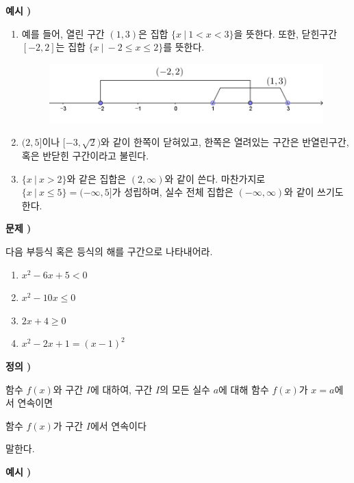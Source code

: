\documentclass{oblivoir}
\newcounter{num}
\newcommand\defi[1]
{\bigskip\par\noindent\stepcounter{num} \textbf{정의 \thenum) #1}\par\noindent}
\newcommand\exam[1]
{\bigskip\par\noindent\stepcounter{num} \textbf{예시 \thenum) #1}\par\noindent}
\newcommand\prob[1]
{\bigskip\par\noindent\stepcounter{num} \textbf{문제 \thenum) #1}\par\noindent}
\newcommand\ba{\ensuremath{\:|\:}}
\let\emph\textsf
\begin{document}
%
\exam{}
\begin{enumerate}[label=(\arabic*)]
\item
예를 들어, 열린 구간 \((1,3)\)은 집합 \(\{x\ba 1<x<3\}\)을 뜻한다.
또한, 닫힌구간 \([-2,2]\)는 집합 \(\{x\ba-2\le x\le 2\}\)를 뜻한다.
\begin{figure}[h!]
\centering
\includegraphics{intervals}
\end{figure}
\item
\((2,5]\)이나 \([-3,\sqrt2)\)와 같이 한쪽이 닫혀있고, 한쪽은 열려있는 구간은 \emph{반열린구간}, 혹은 \emph{반닫힌 구간}이라고 불린다.
\item
\(\{x\ba x>2\}\)와 같은 집합은 \((2,\infty)\)와 같이 쓴다.
마찬가지로 \(\{x\ba x\le 5\}=(-\infty,5]\)가 성립하며, 실수 전체 집합은 \((-\infty,\infty)\)와 같이 쓰기도 한다.
\end{enumerate}

%
\prob{}
다음 부등식 혹은 등식의 해를 구간으로 나타내어라.
\begin{enumerate}[label=(\arabic*)]
\item
\(x^2-6x+5<0\)
\item
\(x^2-10x\le0\)
\item
\(2x+4\ge0\)
\item
\(x^2-2x+1=(x-1)^2\)
\end{enumerate}
\begin{mdframed}

%
\defi{}
함수 \(f(x)\)와 구간 \(I\)에 대하여, 구간 \(I\)의 모든 실수 \(a\)에 대해 함수 \(f(x)\)가 \(x=a\)에서 연속이면
\begin{center}
함수 \(f(x)\)가 구간 \(I\)에서 \emph{연속}이다
\end{center}
 말한다.
\end{mdframed}

%
\exam{}
\end{document}
